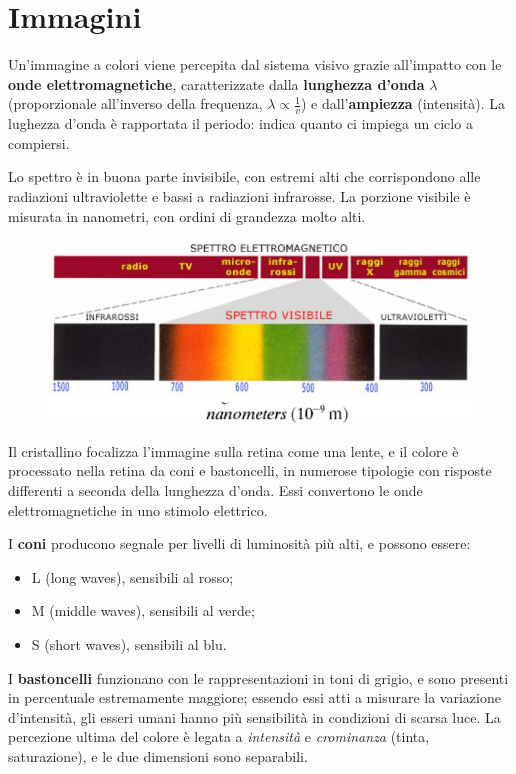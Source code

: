 \section{Immagini}
Un'immagine a colori viene percepita dal sistema visivo grazie all'impatto con le \textbf{onde elettromagnetiche}, caratterizzate dalla \textbf{lunghezza d'onda} $\lambda$ (proporzionale all'inverso della frequenza, $\lambda \propto \frac{1}{v}$) e dall'\textbf{ampiezza} (intensità). La lughezza d'onda è rapportata il periodo: indica quanto ci impiega un ciclo a compiersi.

Lo spettro è in buona parte invisibile, con estremi alti che corrispondono alle radiazioni ultraviolette e bassi a radiazioni infrarosse. La porzione visibile è misurata in nanometri, con ordini di grandezza molto alti.

\begin{figure}[h]
	\centering
	\includegraphics[scale=0.6]{Lezioni/Immagini/arcobaleno}
\end{figure}

Il cristallino focalizza l'immagine sulla retina come una lente, e il colore è processato nella retina da coni e bastoncelli, in numerose tipologie con risposte differenti a seconda della lunghezza d'onda. Essi convertono le onde elettromagnetiche in uno stimolo elettrico.

I \textbf{coni} producono segnale per livelli di luminosità più alti, e possono essere:
\begin{itemize}
	\item L (long waves), sensibili al rosso;
	\item M (middle waves), sensibili al verde;
	\item S (short waves), sensibili al blu.
\end{itemize}

I \textbf{bastoncelli} funzionano con le rappresentazioni in toni di grigio, e sono presenti in percentuale estremamente maggiore; essendo essi atti a misurare la variazione d'intensità, gli esseri umani hanno più sensibilità in condizioni di scarsa luce. La percezione ultima del colore è legata a \textit{intensità} e \textit{crominanza} (tinta, saturazione), e le due dimensioni sono separabili. 

